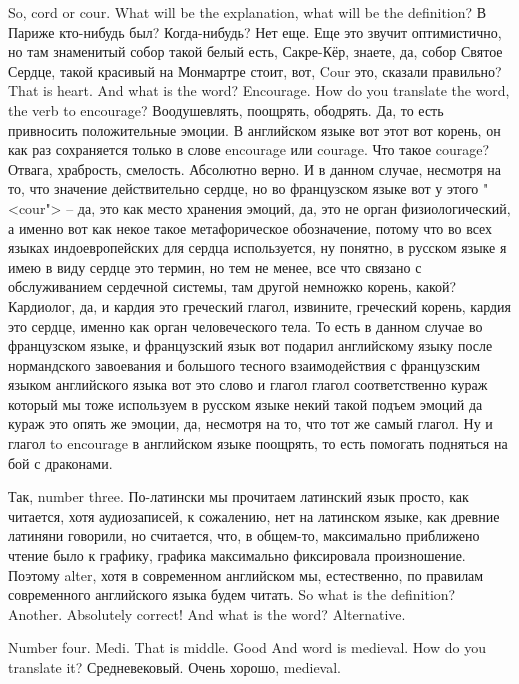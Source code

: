 \documentclass[main.tex]{subfiles}
\begin{document}
So, cord or cour.
What will be the explanation, what will be the definition?
В Париже кто-нибудь был? Когда-нибудь? Нет еще. Еще это звучит оптимистично, но там знаменитый собор такой белый есть, Сакре-Кёр, знаете, да, собор Святое Сердце, такой красивый на Монмартре стоит, вот, Cour это, сказали правильно?
That is heart.
And what is the word? Encourage.
How do you translate the word, the verb to encourage?
Воодушевлять, поощрять, ободрять.
Да, то есть привносить положительные эмоции.
В английском языке вот этот вот корень, он как раз сохраняется только в слове encourage или courage.
Что такое courage? Отвага, храбрость, смелость.
Абсолютно верно.
И в данном случае, несмотря на то, что значение действительно сердце, но во французском языке вот у этого "<cour"> -- да, это как место хранения эмоций, да, это не орган физиологический, а именно вот как некое такое метафорическое обозначение, потому что во всех языках индоевропейских для сердца используется, ну понятно, в русском языке я имею в виду сердце это термин, но тем не менее, все что связано с обслуживанием сердечной системы, там другой немножко корень, какой? Кардиолог, да, и кардия это греческий глагол, извините, греческий корень, кардия это сердце, именно как орган человеческого тела.
То есть в данном случае во французском языке, и французский язык вот подарил английскому языку после нормандского завоевания и большого тесного взаимодействия с французским языком английского языка вот это слово и глагол глагол соответственно кураж который мы тоже используем в русском языке некий такой подъем эмоций да кураж это опять же эмоции, да, несмотря на то, что тот же самый глагол.
Ну и глагол to encourage в английском языке поощрять, то есть помогать подняться на бой с драконами.

Так, number three.
По-латински мы прочитаем латинский язык просто, как читается, хотя аудиозаписей, к сожалению, нет на латинском языке, как древние латиняни говорили, но считается, что, в общем-то, максимально приближено чтение было к графику, графика максимально фиксировала произношение.
Поэтому alter, хотя в современном английском мы, естественно, по правилам современного английского языка будем читать.
So what is the definition? Another. Absolutely correct!
And what is the word? Alternative.

Number four.
Medi. That is middle. Good
And word is medieval.
How do you translate it? Средневековый.
Очень хорошо, medieval.
\end{document}
